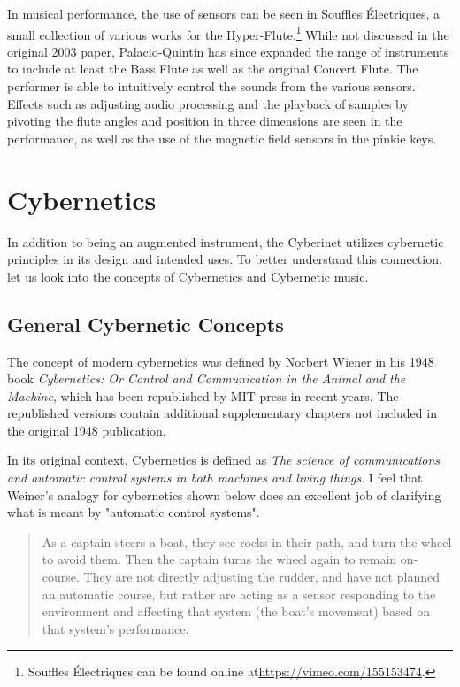 In musical performance, the use of sensors can be seen in Souffles Électriques, a small collection of various works for the Hyper-Flute.\footnote{Souffles Électriques can be found online at\url{https://vimeo.com/155153474}.} While not discussed in the original 2003 paper, Palacio-Quintin has since expanded the range of instruments to include at least the Bass Flute as well as the original Concert Flute. The performer is able to intuitively control the sounds from the various sensors. Effects such as adjusting audio processing and the playback of samples by pivoting the flute angles and position in three dimensions are seen in the performance, as well as the use of the magnetic field sensors in the pinkie keys.


\section{Cybernetics}
In addition to being an augmented instrument, the Cyberinet utilizes cybernetic principles in its design and intended uses. To better understand this connection, let us look into the concepts of Cybernetics and Cybernetic music.

\subsection{General Cybernetic Concepts}
The concept of modern cybernetics was defined by Norbert Wiener in his 1948 book \textit{Cybernetics: Or Control and Communication in the Animal and the Machine}, which has been republished by MIT press in recent years.\cite{WeinerCybernetics2019} The republished versions contain additional supplementary chapters not included in the original 1948 publication.

In its original context, Cybernetics is defined as \textit{The science of communications and automatic control systems in both machines and living things}. I feel that Weiner's analogy for cybernetics shown below does an excellent job of clarifying what is meant by "automatic control systems".

\begin{quote}
  
    As a captain steers a boat, they see rocks in their path, and turn the wheel to avoid them. Then the captain turns the wheel again to remain on-course. They are not directly adjusting the rudder, and have not planned an automatic course, but rather are acting as a sensor responding to the environment and affecting that system (the boat's movement) based on that system's performance.
\end{quote}

